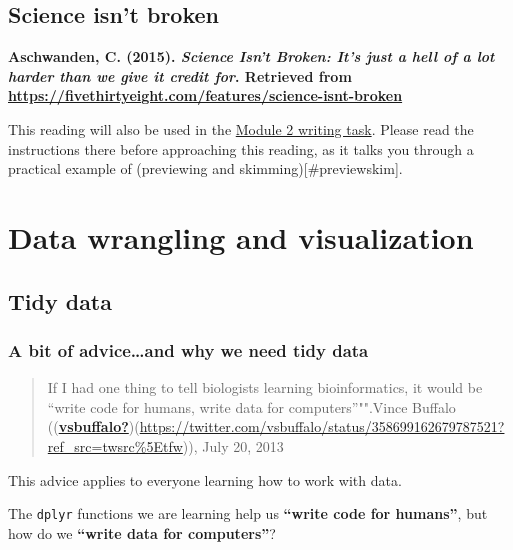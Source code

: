 \documentclass[
  openany]{book}
\begin{document}
\hypertarget{science-isnt-broken}{%
\subsection{Science isn't broken}\label{science-isnt-broken}}

\textbf{Aschwanden, C. (2015). \emph{Science Isn't Broken: It's just a hell of a lot harder than we give it credit for}. Retrieved from \url{https://fivethirtyeight.com/features/science-isnt-broken}}

This reading will also be used in the \protect\hyperlink{module-2-writing-task}{Module 2 writing task}. Please read the instructions there before approaching this reading, as it talks you through a practical example of (previewing and skimming){[}\#previewskim{]}.

\hypertarget{data-wrangling-and-visualization}{%
\section{Data wrangling and visualization}\label{data-wrangling-and-visualization}}

\hypertarget{tidy-data}{%
\subsection{Tidy data}\label{tidy-data}}

\hypertarget{a-bit-of-adviceand-why-we-need-tidy-data}{%
\subsubsection{\texorpdfstring{A bit of advice\ldots and why we need \textbf{tidy} data}{A bit of advice\ldots and why we need tidy data}}\label{a-bit-of-adviceand-why-we-need-tidy-data}}

\begin{quote}
If I had one thing to tell biologists learning bioinformatics, it would be ``write code for humans, write data for computers''"".Vince Buffalo ((\protect\hyperlink{ref-vsbuffalo}{\textbf{vsbuffalo?}})(\url{https://twitter.com/vsbuffalo/status/358699162679787521?ref_src=twsrc\%5Etfw})), July 20, 2013
\end{quote}

This advice applies to everyone learning how to work with data.

The \texttt{dplyr} functions we are learning help us \textbf{``write code for humans''}, but how do we \textbf{``write data for computers''}?
\end{document}
